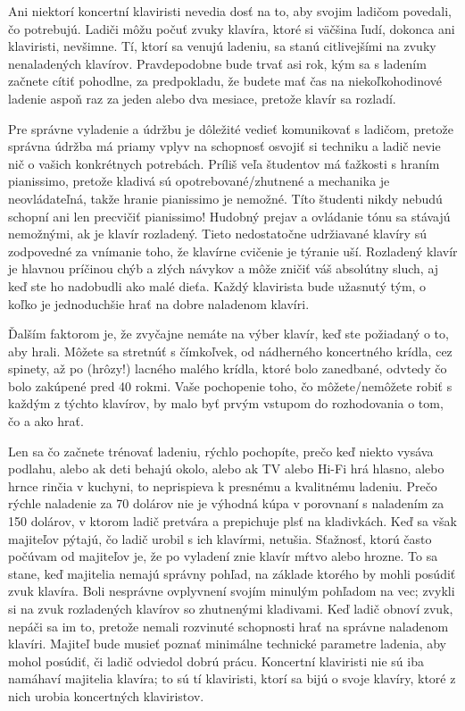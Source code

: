 \documentclass[11pt,a4paper]{book}
\begin{document}
Ani niektorí koncertní klaviristi nevedia dosť na to, aby svojim ladičom povedali, čo potrebujú. Ladiči môžu počuť zvuky klavíra, ktoré si väčšina ľudí, dokonca ani klaviristi, nevšimne. Tí, ktorí sa venujú ladeniu, sa stanú citlivejšími na zvuky nenaladených klavírov. Pravdepodobne bude trvať asi rok, kým sa s ladením začnete cítiť pohodlne, za predpokladu, že budete mať čas na niekoľkohodinové ladenie aspoň raz za jeden alebo dva mesiace, pretože klavír sa rozladí.

Pre správne vyladenie a údržbu je dôležité vedieť komunikovať s ladičom, pretože správna údržba má priamy vplyv na schopnosť osvojiť si techniku ​​a ladič nevie nič o vašich konkrétnych potrebách. Príliš veľa študentov má ťažkosti s hraním pianissimo, pretože kladivá sú opotrebované/zhutnené a mechanika je neovládateľná, takže hranie pianissimo je nemožné. Títo študenti nikdy nebudú schopní ani len precvičiť pianissimo! Hudobný prejav a ovládanie tónu sa stávajú nemožnými, ak je klavír rozladený. Tieto nedostatočne udržiavané klavíry sú zodpovedné za vnímanie toho, že klavírne cvičenie je týranie uší. Rozladený klavír je hlavnou príčinou chýb a zlých návykov a môže zničiť váš absolútny sluch, aj keď ste ho nadobudli ako malé dieťa. Každý klavirista bude užasnutý tým, o koľko je jednoduchšie hrať na dobre naladenom klavíri.

Ďalším faktorom je, že zvyčajne nemáte na výber klavír, keď ste požiadaný o to, aby hrali. Môžete sa stretnúť s čímkoľvek, od nádherného koncertného krídla, cez spinety, až po (hrôzy!) lacného malého krídla, ktoré bolo zanedbané, odvtedy čo bolo zakúpené pred 40 rokmi. Vaše pochopenie toho, čo môžete/nemôžete robiť s každým z týchto klavírov, by malo byť prvým vstupom do rozhodovania o tom, čo a ako hrať.

Len sa čo začnete trénovať ladeniu, rýchlo pochopíte, prečo keď niekto vysáva podlahu, alebo ak deti behajú okolo, alebo ak TV alebo Hi-Fi hrá hlasno, alebo hrnce rinčia v kuchyni, to neprispieva k presnému a kvalitnému ladeniu. Prečo rýchle naladenie za 70 dolárov nie je výhodná kúpa v porovnaní s naladením za 150 dolárov, v ktorom ladič pretvára a prepichuje plsť na kladivkách. Keď sa však majiteľov pýtajú, čo ladič urobil s ich klavírmi, netušia. Sťažnosť, ktorú často počúvam od majiteľov je, že po vyladení znie klavír mŕtvo alebo hrozne. To sa stane, keď majitelia nemajú správny pohľad, na základe ktorého by mohli posúdiť zvuk klavíra. Boli nesprávne ovplyvnení svojím minulým pohľadom na vec; zvykli si na zvuk rozladených klavírov so zhutnenými kladivami. Keď ladič obnoví zvuk, nepáči sa im to, pretože nemali rozvinuté schopnosti hrať na správne naladenom klavíri. Majiteľ bude musieť poznať minimálne technické parametre ladenia, aby mohol posúdiť, či ladič odviedol dobrú prácu. Koncertní klaviristi nie sú iba namáhaví majitelia klavíra; to sú tí klaviristi, ktorí sa bijú o svoje klavíry, ktoré z nich urobia koncertných klaviristov.
\end{document}
